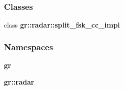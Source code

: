 \subsubsection*{Classes}
\begin{DoxyCompactItemize}
\item 
class {\bf gr\+::radar\+::split\+\_\+fsk\+\_\+cc\+\_\+impl}
\end{DoxyCompactItemize}
\subsubsection*{Namespaces}
\begin{DoxyCompactItemize}
\item 
 {\bf gr}
\item 
 {\bf gr\+::radar}
\end{DoxyCompactItemize}

